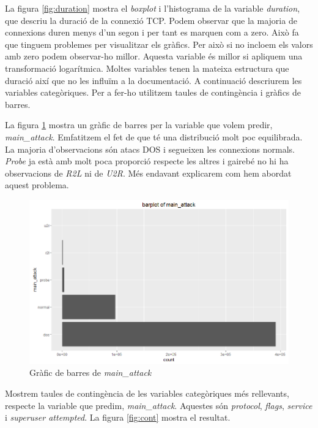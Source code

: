 \documentclass[a4paper]{article} %
\begin{document}
La figura \ref{fig:duration} mostra el \textit{boxplot} i l'histograma de la variable \textit{duration}, que descriu la duració de la connexió TCP. Podem observar que la majoria de connexions duren menys d'un segon i per tant es marquen com a zero. Això fa que tinguem problemes per visualitzar els gràfics. Per això si no incloem els valors amb zero podem observar-ho millor. Aquesta variable és millor si apliquem una transformació logarítmica.
Moltes variables tenen la mateixa estructura que duració així que no les influïm a la documentació. A continuació descriurem les variables categòriques. Per a fer-ho utilitzem taules de contingència i gràfics de barres.

La figura \ref{fig:barplots} mostra un gràfic de barres per la variable que volem predir, \textit{main\_attack}. Emfatitzem el fet de que té una distribució molt poc equilibrada. La majoria d'observacions són atacs DOS i segueixen les connexions normals. \textit{Probe} ja està amb molt poca proporció respecte les altres i gairebé no hi ha observacions de \textit{R2L} ni de \textit{U2R}. Més endavant explicarem com hem abordat aquest problema.

\begin{figure}[H]
	\centering
	\includegraphics[scale=0.5]{bar_main_attack.png}
	\caption{Gràfic de barres de \textit{main\_attack}}
	\label{fig:barplots}
\end{figure}
Mostrem taules de contingència de les variables categòriques més rellevants, respecte la variable que predim, \textit{main\_attack}. Aquestes són \textit{protocol}, \textit{flags}, \textit{service} i \textit{superuser attempted}. La figura \ref{fig:cont} mostra el resultat.
\end{document}
